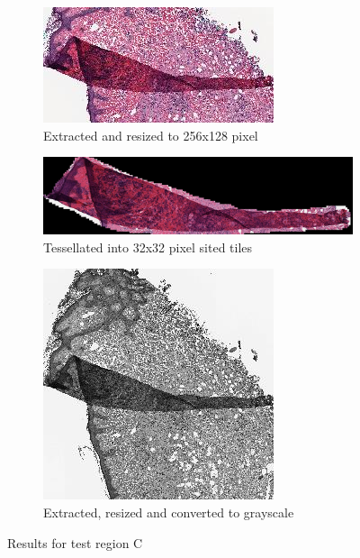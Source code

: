 \begin{figure}[H]
\begin{subfigure}{.5\textwidth}
		\centering
		\includegraphics[width=.8\linewidth]{img/ts_test/2_r128.jpeg}
		\caption{Extracted and resized to 256x128 pixel}
		\label{subfig5:c3}
	\end{subfigure}
	\begin{subfigure}{.5\textwidth}
		\centering
		\includegraphics[width=1.\linewidth]{img/ts_test/2_stitched.jpeg}
		\caption{Tessellated into 32x32 pixel sited tiles}
		\label{subfig5:c4}
	\end{subfigure}
	\begin{subfigure}{.5\textwidth}
		\centering
		\includegraphics[width=.8\linewidth]{img/ts_test/2_g.jpeg}
		\caption{Extracted, resized and converted to grayscale}
		\label{subfig5:c5}
	\end{subfigure}
	\caption{Results for test region C}
	\label{fig5_result3}
\end{figure}
